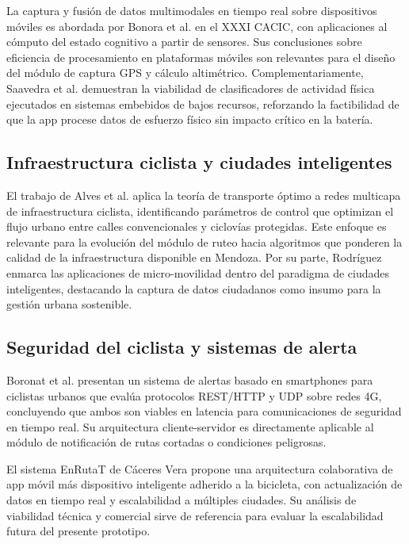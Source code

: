 \documentclass{llncs}
\begin{document}
La captura y fusión de datos multimodales en tiempo real sobre dispositivos móviles es abordada por Bonora et al. \cite{Bonora2025} en el XXXI CACIC, con aplicaciones al cómputo del estado cognitivo a partir de sensores. Sus conclusiones sobre eficiencia de procesamiento en plataformas móviles son relevantes para el diseño del módulo de captura GPS y cálculo altimétrico. Complementariamente, Saavedra et al. \cite{Saavedra2025} demuestran la viabilidad de clasificadores de actividad física ejecutados en sistemas embebidos de bajos recursos, reforzando la factibilidad de que la app procese datos de esfuerzo físico sin impacto crítico en la batería.

\subsection{Infraestructura ciclista y ciudades inteligentes}

El trabajo de Alves et al. \cite{Alves2025} aplica la teoría de transporte óptimo a redes multicapa de infraestructura ciclista, identificando parámetros de control que optimizan el flujo urbano entre calles convencionales y ciclovías protegidas. Este enfoque es relevante para la evolución del módulo de ruteo hacia algoritmos que ponderen la calidad de la infraestructura disponible en Mendoza. Por su parte, Rodríguez \cite{Rodriguez2025} enmarca las aplicaciones de micro-movilidad dentro del paradigma de ciudades inteligentes, destacando la captura de datos ciudadanos como insumo para la gestión urbana sostenible.

\subsection{Seguridad del ciclista y sistemas de alerta}

Boronat et al. \cite{Boronat2021} presentan un sistema de alertas basado en smartphones para ciclistas urbanos que evalúa protocolos REST/HTTP y UDP sobre redes 4G, concluyendo que ambos son viables en latencia para comunicaciones de seguridad en tiempo real. Su arquitectura cliente-servidor es directamente aplicable al módulo de notificación de rutas cortadas o condiciones peligrosas.

El sistema EnRutaT de Cáceres Vera \cite{Caceres2021} propone una arquitectura colaborativa de app móvil más dispositivo inteligente adherido a la bicicleta, con actualización de datos en tiempo real y escalabilidad a múltiples ciudades. Su análisis de viabilidad técnica y comercial sirve de referencia para evaluar la escalabilidad futura del presente prototipo.
\end{document}
